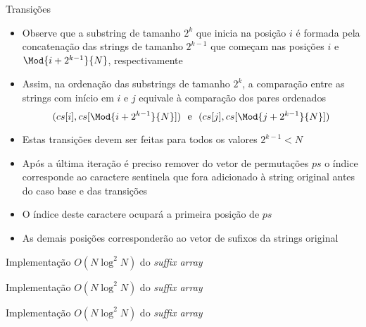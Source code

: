 \begin{frame}[fragile]{Transições}

    \begin{itemize}
        \item Observe que a substring de tamanho $2^k$ que inicia na posição $i$ é formada
            pela concatenação das strings de tamanho $2^{k - 1}$ que começam nas posições
            $i$ e $\Mod{i + 2^{k - 1}}{N}$, respectivamente

        \item Assim, na ordenação das substrings de tamanho $2^k$, a comparação entre as 
            strings com início em $i$ e $j$ equivale à comparação dos pares ordenados
            $$(cs[i], cs[\Mod{i + 2^{k - 1}}{N}])\ \ \mbox{e}\ \ (cs[j], cs[\Mod{j + 2^{k - 1}}{N}])$$

        \item Estas transições devem ser feitas para todos os valores $2^{k - 1} < N$

        \item Após a última iteração é preciso remover do vetor de permutações $ps$ o índice
            corresponde ao caractere sentinela que fora adicionado à string original antes do
            caso base e das transições

        \item O índice deste caractere ocupará a primeira posição de $ps$

        \item As demais posições corresponderão ao vetor de sufixos da strings original
    \end{itemize}

\end{frame}

\begin{frame}[fragile]{Implementação $O(N\log^2 N)$ do {\it suffix array}}
\end{frame}

\begin{frame}[fragile]{Implementação $O(N\log^2 N)$ do {\it suffix array}}
\end{frame}

\begin{frame}[fragile]{Implementação $O(N\log^2 N)$ do {\it suffix array}}
\end{frame}

